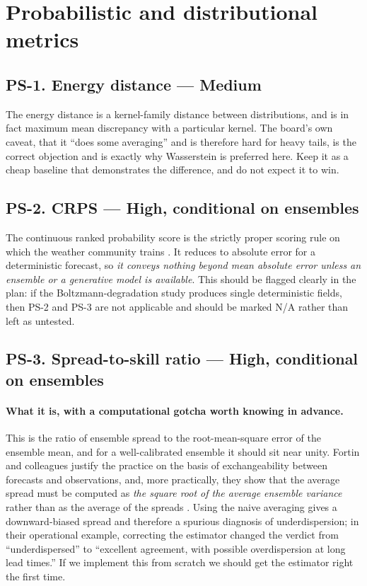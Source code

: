 \documentclass[11pt]{article}
\newcommand{\High}{\textbf{High}}
\newcommand{\Med}{Medium}
\begin{document}
\section{Probabilistic and distributional metrics}

\subsection{PS-1. Energy distance --- \Med{}}

The energy distance is a kernel-family distance between distributions, and is in fact
maximum mean discrepancy with a particular kernel. The board's own caveat, that it ``does
some averaging'' and is therefore hard for heavy tails, is the correct objection and is
exactly why Wasserstein is preferred here. Keep it as a cheap baseline that demonstrates the
difference, and do not expect it to win.

\subsection{PS-2. CRPS --- \High{}, conditional on ensembles}

The continuous ranked probability score is the strictly proper scoring rule on which the
weather community trains \cite{gneitingraftery2007}. It reduces to absolute error for a
deterministic forecast, so \emph{it conveys nothing beyond mean absolute error unless an
ensemble or a generative model is available}. This should be flagged clearly in the plan: if
the Boltzmann-degradation study produces single deterministic fields, then PS-2 and PS-3 are
not applicable and should be marked N/A rather than left as untested.

\subsection{PS-3. Spread-to-skill ratio --- \High{}, conditional on ensembles}

\paragraph{What it is, with a computational gotcha worth knowing in advance.} This is the
ratio of ensemble spread to the root-mean-square error of the ensemble mean, and for a
well-calibrated ensemble it should sit near unity. Fortin and colleagues justify the practice
on the basis of exchangeability between forecasts and observations, and, more practically,
they show that the average spread must be computed as \emph{the square root of the average
ensemble variance} rather than as the average of the spreads \cite{fortin2014}. Using the
naive averaging gives a downward-biased spread and therefore a spurious diagnosis of
underdispersion; in their operational example, correcting the estimator changed the verdict
from ``underdispersed'' to ``excellent agreement, with possible overdispersion at long lead
times.'' If we implement this from scratch we should get the estimator right the first time.
\end{document}
